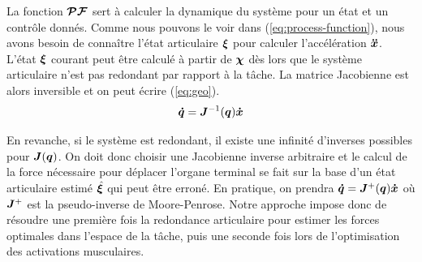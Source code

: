 \documentclass[pdftex,a4paper,11pt]{article}
\begin{document}
%

La fonction $\boldsymbol{\mathcal{PF}}$ sert à calculer la dynamique du système pour un état
et un contrôle donnés.
Comme nous pouvons le voir dans (\ref{eq:process-function}), nous avons besoin
de connaître l'état articulaire $\boldsymbol{\xi}$ pour calculer l'accélération $\boldsymbol{\ddot{x}}$.
L'état $\boldsymbol{\xi}$ courant peut être calculé à partir de $\boldsymbol{\chi}$ dès lors
que le système articulaire n'est pas redondant par rapport à la tâche.
La matrice Jacobienne est alors inversible et on peut écrire (\ref{eq:geo}).
\begin{equation}
    \label{eq:geo}
    \boldsymbol{\dot{q}} = \boldsymbol{J}^{-1}(\boldsymbol{q})\boldsymbol{\dot{x}}
\end{equation}

En revanche, si le système est redondant, il existe une infinité d'inverses possibles
pour $\boldsymbol{J}(\boldsymbol{q})$.
On doit donc choisir une Jacobienne inverse arbitraire et le calcul de la force
nécessaire pour déplacer l'organe terminal se fait sur la base d'un état
articulaire estimé $\hat{\boldsymbol{\xi}}$ qui peut être erroné. En pratique, on prendra $\boldsymbol{\dot{q}} = \boldsymbol{J}^+(\boldsymbol{q})\boldsymbol{\dot{x}}$
où $\boldsymbol{J}^+$ est la pseudo-inverse de Moore-Penrose.
Notre approche impose donc de résoudre une première fois la redondance
articulaire pour estimer les forces optimales dans l'espace de la tâche, puis
une seconde fois lors de l'optimisation des activations musculaires.
\end{document}
